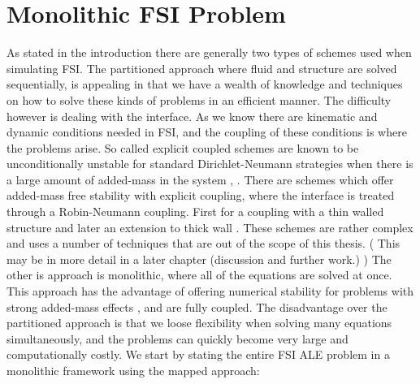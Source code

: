 \section{Monolithic FSI Problem}
As stated in the introduction there are generally two types of schemes used when simulating FSI. The partitioned approach where fluid and structure are solved sequentially, is appealing in that we have a wealth of knowledge and techniques on how to solve these kinds of problems in an efficient manner. The difficulty however is dealing with the interface. As we know there are kinematic and dynamic conditions needed in FSI, and the coupling of these conditions is where the problems arise. So called explicit coupled schemes are known to be unconditionally unstable for standard Dirichlet-Neumann strategies when there is a large amount of added-mass in the system \cite{Fernandez2015}, \cite{VanBrummelen2009}. There are schemes which offer added-mass free stability with explicit coupling, where the interface is treated through a Robin-Neumann coupling. First for a coupling with a thin walled structure \cite{Fernandez2013} and later an extension to thick wall \cite{Fernandez2015}. These schemes are rather complex and uses a number of techniques that are out of the scope of this thesis. ( This may be in more detail in a later chapter (discussion and further work.) ) \newline
The other is approach is monolithic, where all of the equations are solved at once. This approach has the advantage of offering numerical stability for problems with strong added-mass effects \cite{Liu2014}, and are fully coupled. The disadvantage over the partitioned approach is that we loose flexibility when solving many equations simultaneously, and the problems can quickly become very large and computationally costly. \newline
We start by stating the entire FSI ALE problem in a monolithic framework using the mapped approach: 



